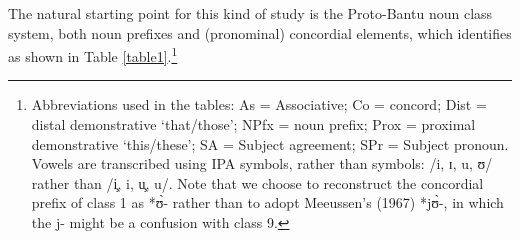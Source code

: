 \documentclass[output=paper,,modfonts,nonflat]{langsci/langscibook-Hyman-et-al}
\begin{document}
The natural starting point for this kind of study is the Proto-Bantu noun class system, both noun prefixes and (pronominal) concordial elements, which  identifies as shown in Table \ref{table1}.\footnote{Abbreviations used in the tables: As = Associative; Co = concord; Dist = distal demonstrative `that/those'; NPfx = noun prefix; Prox = proximal demonstrative `this/these'; SA = Subject agreement; SPr = Subject pronoun. Vowels are transcribed using IPA symbols, rather than  symbols: /i, ɪ, u, ʊ/ rather than /i̧, i, u̧, u/. Note that we choose to reconstruct the concordial prefix of class 1 as *ʊ̀- rather than to adopt Meeussen's (1967) *jʊ̀-, in which the j- might be a confusion with class 9.}

\end{document}
